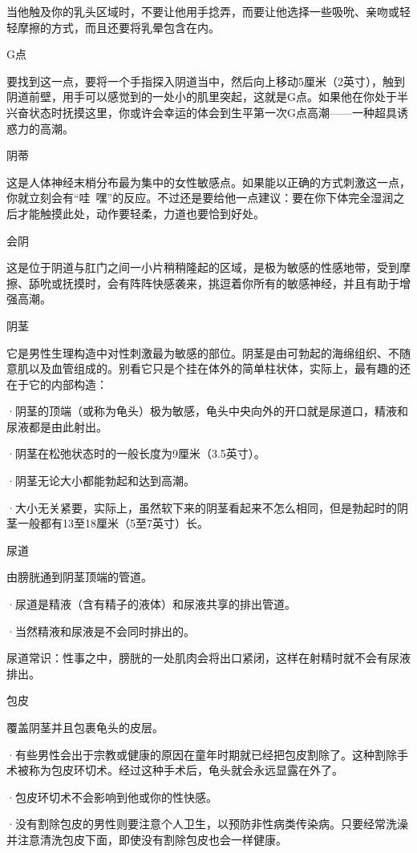 \documentclass[12pt,UTF8,openany]{ctexbook}
\begin{document}
当他触及你的乳头区域时，不要让他用手捻弄，而要让他选择一些吸吮、亲吻或轻轻摩擦的方式，而且还要将乳晕包含在内。

G点

要找到这一点，要将一个手指探入阴道当中，然后向上移动5厘米（2英寸），触到阴道前壁，用手可以感觉到的一处小的肌里突起，这就是G点。如果他在你处于半兴奋状态时抚摸这里，你或许会幸运的体会到生平第一次G点高潮——一种超具诱惑力的高潮。

阴蒂

这是人体神经末梢分布最为集中的女性敏感点。如果能以正确的方式刺激这一点，你就立刻会有“哇~嘿”的反应。不过还是要给他一点建议：要在你下体完全湿润之后才能触摸此处，动作要轻柔，力道也要恰到好处。

会阴

这是位于阴道与肛门之间一小片稍稍隆起的区域，是极为敏感的性感地带，受到摩擦、舔吮或抚摸时，会有阵阵快感袭来，挑逗着你所有的敏感神经，并且有助于增强高潮。


阴茎

它是男性生理构造中对性刺激最为敏感的部位。阴茎是由可勃起的海绵组织、不随意肌以及血管组成的。别看它只是个挂在体外的简单柱状体，实际上，最有趣的还在于它的内部构造：

·阴茎的顶端（或称为龟头）极为敏感，龟头中央向外的开口就是尿道口，精液和尿液都是由此射出。

·阴茎在松弛状态时的一般长度为9厘米（3.5英寸）。

·阴茎无论大小都能勃起和达到高潮。

·大小无关紧要，实际上，虽然软下来的阴茎看起来不怎么相同，但是勃起时的阴茎一般都有13至18厘米（5至7英寸）长。

尿道

由膀胱通到阴茎顶端的管道。

·尿道是精液（含有精子的液体）和尿液共享的排出管道。

·当然精液和尿液是不会同时排出的。

尿道常识：性事之中，膀胱的一处肌肉会将出口紧闭，这样在射精时就不会有尿液排出。

包皮

覆盖阴茎并且包裹龟头的皮层。

·有些男性会出于宗教或健康的原因在童年时期就已经把包皮割除了。这种割除手术被称为包皮环切术。经过这种手术后，龟头就会永远显露在外了。

·包皮环切术不会影响到他或你的性快感。

·没有割除包皮的男性则要注意个人卫生，以预防非性病类传染病。只要经常洗澡并注意清洗包皮下面，即使没有割除包皮也会一样健康。
\end{document}
